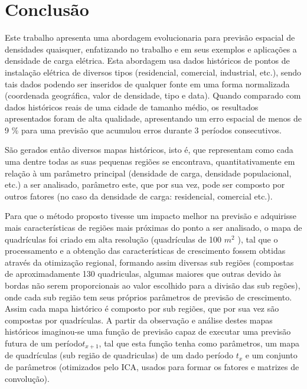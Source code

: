 \chapter{Conclusão}
\label{conclusao}

Este trabalho apresenta uma abordagem evolucionaria para previsão espacial de densidades quaisquer, enfatizando no trabalho e em seus exemplos e aplicações a densidade de carga elétrica. Esta abordagem usa dados históricos de pontos de instalação elétrica de diversos tipos (residencial, comercial, industrial, etc.), sendo tais dados podendo ser inseridos de qualquer fonte em uma forma normalizada (coordenada geográfica, valor de densidade, tipo e  data). Quando comparado com dados históricos reais de uma cidade de tamanho médio, os resultados apresentados foram de alta qualidade, apresentando um erro espacial de menos de 9 \% para uma previsão que acumulou erros durante 3 períodos consecutivos. 

São gerados então diversos mapas históricos, isto é, que representam como cada uma dentre todas as suas pequenas regiões se encontrava, quantitativamente em relação à um parâmetro principal (densidade de carga, densidade populacional, etc.) a ser analisado, parâmetro este, que por sua vez, pode ser composto por outros fatores (no caso da densidade de carga: residencial, comercial etc.). 

Para que o método proposto tivesse um impacto melhor na previsão e adquirisse mais características de regiões mais próximas do ponto a ser analisado, o mapa de quadrículas foi criado em alta resolução (quadrículas de 100 \(m^2\) ), tal que o processamento e a obtenção das características de crescimento fossem obtidas através da otimização regional, formando assim diversas sub regiões (compostas de aproximadamente 130 quadriculas, algumas maiores que outras devido às bordas não serem proporcionais ao valor escolhido para a divisão das sub regões), onde cada sub região tem seus próprios parâmetros de previsão de crescimento. Assim cada mapa histórico é composto por sub regiões, que por sua vez são compostas por quadrículas.   
A partir da observação e análise destes mapas históricos imaginou-se uma função de previsão capaz de executar uma previsão futura de um período\(t_{x+1}\), tal que esta função tenha como parâmetros, um mapa de quadrículas (sub região de quadriculas) de um dado período \(t_{x}\) e um conjunto de parâmetros (otimizados pelo ICA, usados para formar os fatores e matrizes de convolução).  

